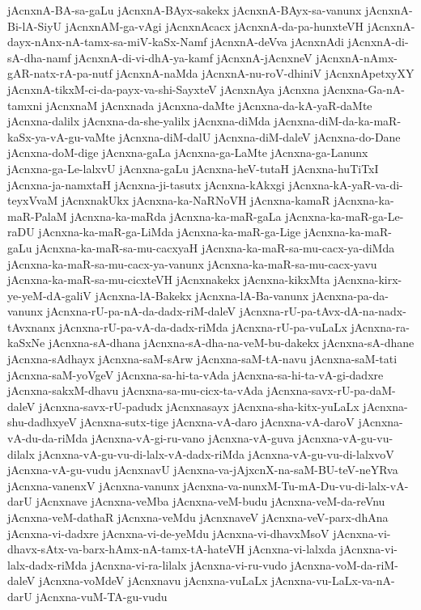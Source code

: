 {jAcnxnA-BA-sa-gaLu
jAcnxnA-BAyx-sakekx
jAcnxnA-BAyx-sa-vanunx
jAcnxnA-Bi-lA-SiyU
jAcnxnAM-ga-vAgi
jAcnxnAcacx
jAcnxnA-da-pa-hunxteVH
jAcnxnA-dayx-nAnx-nA-tamx-sa-miV-kaSx-Namf
jAcnxnA-deVva
jAcnxnAdi
jAcnxnA-di-sA-dha-namf
jAcnxnA-di-vi-dhA-ya-kamf
jAcnxnA-jAcnxneV
jAcnxnA-nAmx-gAR-natx-rA-pa-nutf
jAcnxnA-naMda
jAcnxnA-nu-roV-dhiniV
jAcnxnApetxyXY
jAcnxnA-tikxM-ci-da-payx-va-shi-SayxteV
jAcnxnAya
jAcnxna
jAcnxna-Ga-nA-tamxni
jAcnxnaM
jAcnxnada
jAcnxna-daMte
jAcnxna-da-kA-yaR-daMte
jAcnxna-dalilx
jAcnxna-da-she-yalilx
jAcnxna-diMda
jAcnxna-diM-da-ka-maR-kaSx-ya-vA-gu-vaMte
jAcnxna-diM-dalU
jAcnxna-diM-daleV
jAcnxna-do-Dane
jAcnxna-doM-dige
jAcnxna-gaLa
jAcnxna-ga-LaMte
jAcnxna-ga-Lanunx
jAcnxna-ga-Le-lalxvU
jAcnxna-gaLu
jAcnxna-heV-tutaH
jAcnxna-huTiTxI
jAcnxna-ja-namxtaH
jAcnxna-ji-tasutx
jAcnxna-kAkxgi
jAcnxna-kA-yaR-va-di-teyxVvaM
jAcnxnakUkx
jAcnxna-ka-NaRNoVH
jAcnxna-kamaR
jAcnxna-ka-maR-PalaM
jAcnxna-ka-maRda
jAcnxna-ka-maR-gaLa
jAcnxna-ka-maR-ga-Le-raDU
jAcnxna-ka-maR-ga-LiMda
jAcnxna-ka-maR-ga-Lige
jAcnxna-ka-maR-gaLu
jAcnxna-ka-maR-sa-mu-cacxyaH
jAcnxna-ka-maR-sa-mu-cacx-ya-diMda
jAcnxna-ka-maR-sa-mu-cacx-ya-vanunx
jAcnxna-ka-maR-sa-mu-cacx-yavu
jAcnxna-ka-maR-sa-mu-cicxteVH
jAcnxnakekx
jAcnxna-kikxMta
jAcnxna-kirx-ye-yeM-dA-galiV
jAcnxna-lA-Bakekx
jAcnxna-lA-Ba-vanunx
jAcnxna-pa-da-vanunx
jAcnxna-rU-pa-nA-da-dadx-riM-daleV
jAcnxna-rU-pa-tAvx-dA-na-nadx-tAvxnanx
jAcnxna-rU-pa-vA-da-dadx-riMda
jAcnxna-rU-pa-vuLaLx
jAcnxna-ra-kaSxNe
jAcnxna-sA-dhana
jAcnxna-sA-dha-na-veM-bu-dakekx
jAcnxna-sA-dhane
jAcnxna-sAdhayx
jAcnxna-saM-sArw
jAcnxna-saM-tA-navu
jAcnxna-saM-tati
jAcnxna-saM-yoVgeV
jAcnxna-sa-hi-ta-vAda
jAcnxna-sa-hi-ta-vA-gi-dadxre
jAcnxna-sakxM-dhavu
jAcnxna-sa-mu-cicx-ta-vAda
jAcnxna-savx-rU-pa-daM-daleV
jAcnxna-savx-rU-padudx
jAcnxnasayx
jAcnxna-sha-kitx-yuLaLx
jAcnxna-shu-dadhxyeV
jAcnxna-sutx-tige
jAcnxna-vA-daro
jAcnxna-vA-daroV
jAcnxna-vA-du-da-riMda
jAcnxna-vA-gi-ru-vano
jAcnxna-vA-guva
jAcnxna-vA-gu-vu-dilalx
jAcnxna-vA-gu-vu-di-lalx-vA-dadx-riMda
jAcnxna-vA-gu-vu-di-lalxvoV
jAcnxna-vA-gu-vudu
jAcnxnavU
jAcnxna-va-jAjxcnX-na-saM-BU-teV-neYRva
jAcnxna-vanenxV
jAcnxna-vanunx
jAcnxna-va-nunxM-Tu-mA-Du-vu-di-lalx-vA-darU
jAcnxnave
jAcnxna-veMba
jAcnxna-veM-budu
jAcnxna-veM-da-reVnu
jAcnxna-veM-dathaR
jAcnxna-veMdu
jAcnxnaveV
jAcnxna-veV-parx-dhAna
jAcnxna-vi-dadxre
jAcnxna-vi-de-yeMdu
jAcnxna-vi-dhavxMsoV
jAcnxna-vi-dhavx-sAtx-va-barx-hAmx-nA-tamx-tA-hateVH
jAcnxna-vi-lalxda
jAcnxna-vi-lalx-dadx-riMda
jAcnxna-vi-ra-lilalx
jAcnxna-vi-ru-vudo
jAcnxna-voM-da-riM-daleV
jAcnxna-voMdeV
jAcnxnavu
jAcnxna-vuLaLx
jAcnxna-vu-LaLx-va-nA-darU
jAcnxna-vuM-TA-gu-vudu
}

